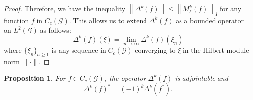 \documentclass[a4paper,11pt,reqno]{amsart}
\theoremstyle{plain}
\newtheorem{prop}[thm]{Proposition}
\theoremstyle{named}
\numberwithin{equation}{section}
\newcommand{\Eea}{\end{eqnarray*}}
\begin{document}
\begin{proof}
		 Therefore, we have the inequality \(\left \|\Delta^k (f) \right \| \leq \left \|M_{\ell}^k (f) \right \|_{I}\) for any function \(f\) in \(C_c (\mathcal G)\).
	 This allows us to extend $\Delta^k (f)$ as a bounded operator on $L^2 (\mathcal G)$ as follows:
				$$\Delta^k (f) (\xi) = \lim\limits_{n \to \infty} \Delta^k (f) (\xi_n)$$
				where $\{\xi_n \}_{n \geq 1}$ is any sequence in $C_c (\mathcal G)$ converging to $\xi$ in the Hilbert module norm $\|\cdot\|.$
			\end{proof}
			\begin{prop}\label{prop21}
				For $f \in C_c (\mathcal G),$ the operator $\Delta^k (f)$ is adjointable and 
				$$\Delta^k (f)^{\ast} = (-1)^k \Delta^k (f^{\ast}).$$ 
			\end{prop}
			
\end{document}
